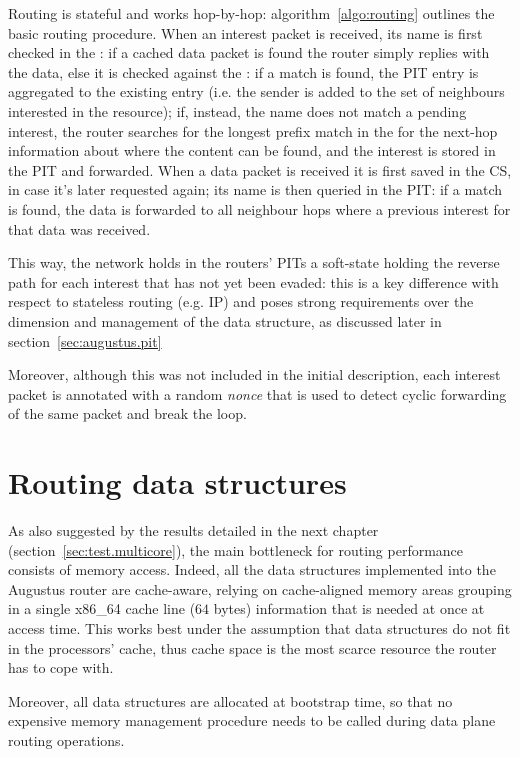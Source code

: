 \documentclass[11pt,a4paper,twoside,titlepage,openany]{book}
\begin{document}
Routing is stateful and works hop-by-hop: algorithm~\ref{algo:routing} outlines the basic routing procedure. When an interest packet is received, its name is first checked in the : if a cached data packet is found the router simply replies with the data, else it is checked against the : if a match is found, the PIT entry is aggregated to the existing entry (i.e. the sender is added to the set of neighbours interested in the resource); if, instead, the name does not match a pending interest, the router searches for the longest prefix match in the  for the next-hop information about where the content can be found, and the interest is stored in the PIT and forwarded.
When a data packet is received it is first saved in the CS, in case it's later requested again; its name is then queried in the PIT: if a match is found, the data is forwarded to all neighbour hops where a previous interest for that data was received.

This way, the network holds in the routers' \gls{PIT}s a soft-state holding the reverse path for each interest that has not yet been evaded: this is a key difference with respect to stateless routing (e.g. IP) and poses strong requirements over the dimension and management of the data structure, as discussed later in section~\ref{sec:augustus.pit}

Moreover, although this was not included in the initial description, each interest packet is annotated with a random \emph{nonce} that is used to detect cyclic forwarding of the same packet and break the loop.


\section{Routing data structures}\label{sec:augustus.structures}
As also suggested by the results detailed in the next chapter (section~\ref{sec:test.multicore}), the main bottleneck for routing performance consists of memory access. Indeed, all the data structures implemented into the Augustus router are cache-aware, relying on cache-aligned memory areas grouping in a single x86\_64 cache line ($64$ bytes) information that is needed at once at access time.
This works best under the assumption that data structures do not fit in the processors' cache, thus cache space is the most scarce resource the router has to cope with.

Moreover, all data structures are allocated at bootstrap time, so that no expensive memory management procedure needs to be called during data plane routing operations.
\end{document}
